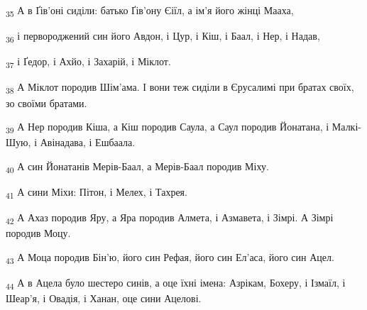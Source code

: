 \begin{tcolorbox}
\textsubscript{35} А в Ґів'оні сиділи: батько Ґів'ону Єіїл, а ім'я його жінці Мааха,
\end{tcolorbox}
\begin{tcolorbox}
\textsubscript{36} і первороджений син його Авдон, і Цур, і Кіш, і Баал, і Нер, і Надав,
\end{tcolorbox}
\begin{tcolorbox}
\textsubscript{37} і Ґедор, і Ахйо, і Захарій, і Міклот.
\end{tcolorbox}
\begin{tcolorbox}
\textsubscript{38} А Міклот породив Шім'ама. І вони теж сиділи в Єрусалимі при братах своїх, зо своїми братами.
\end{tcolorbox}
\begin{tcolorbox}
\textsubscript{39} А Нер породив Кіша, а Кіш породив Саула, а Саул породив Йонатана, і Малкі-Шую, і Авінадава, і Ешбаала.
\end{tcolorbox}
\begin{tcolorbox}
\textsubscript{40} А син Йонатанів Мерів-Баал, а Мерів-Баал породив Міху.
\end{tcolorbox}
\begin{tcolorbox}
\textsubscript{41} А сини Міхи: Пітон, і Мелех, і Тахрея.
\end{tcolorbox}
\begin{tcolorbox}
\textsubscript{42} А Ахаз породив Яру, а Яра породив Алмета, і Азмавета, і Зімрі. А Зімрі породив Моцу.
\end{tcolorbox}
\begin{tcolorbox}
\textsubscript{43} А Моца породив Бін'ю, його син Рефая, його син Ел'аса, його син Ацел.
\end{tcolorbox}
\begin{tcolorbox}
\textsubscript{44} А в Ацела було шестеро синів, а оце їхні імена: Азрікам, Бохеру, і Ізмаїл, і Шеар'я, і Овадія, і Ханан, оце сини Ацелові.
\end{tcolorbox}
